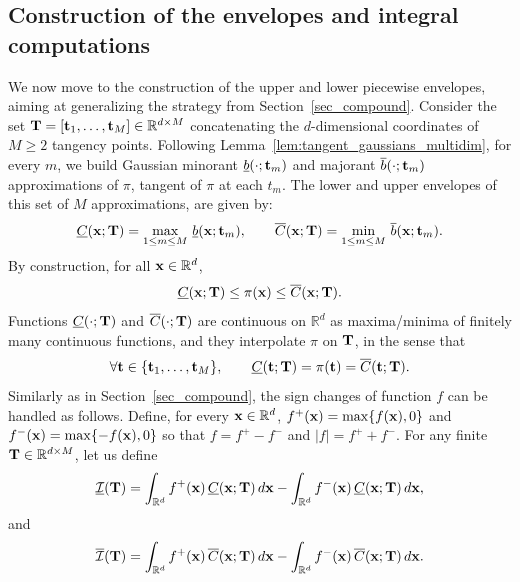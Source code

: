 \documentclass[review]{elsarticle}
\def\x{{\bf x}}
\def\t{{\bf t}}
\def\T{{\bf T}}
\begin{document}
{\subsection{Construction of the envelopes and integral computations}
%
We now move to the construction of the upper and lower piecewise envelopes, aiming at generalizing the strategy from Section~\ref{sec_compound}. Consider the set $\T=[\t_1,\dots,\t_M]\in \mathbb{R}^{d \times M}$ concatenating the $d$-dimensional coordinates of $M \geq 2$ tangency points. Following Lemma~\ref{lem:tangent_gaussians_multidim}, for every $m$, we build Gaussian minorant $\underline{b}(\cdot;\t_m)$ and majorant $\overline{b}(\cdot;\t_m)$ approximations of $\pi$, tangent of $\pi$ at each $t_m$. The lower and upper envelopes of this set of $M$ approximations, are given by:
\begin{equation}
\label{eq:envelopes_multidim}
\underline{C}(\x;\T) = \max_{1\le m\le M}\,\underline{b}(\x;\t_m),
\qquad
\overline{C}(\x;\T) = \min_{1\le m\le M}\,\overline{b}(\x;\t_m).
\end{equation}
By construction, for all $\x\in\mathbb{R}^d$,
\begin{equation}
\label{eq:envelope_bounds_multidim}
\underline{C}(\x;\T)\le \pi(\x)\le \overline{C}(\x;\T).
\end{equation}
Functions $\underline{C}(\cdot;\T)$ and $\overline{C}(\cdot;\T)$ are continuous on $\mathbb{R}^d$ as maxima/minima of finitely many continuous functions, and they interpolate $\pi$ on $\T$, in the sense that
\begin{equation}
\label{eq:interpolation_multidim}
\forall \t \in \{\t_1,\ldots,\t_M\},\qquad
\underline{C}(\t;\T)=\pi(\t)=\overline{C}(\t;\T).
\end{equation}
Similarly as in Section~\ref{sec_compound}, the sign changes of function $f$ can be handled as follows. Define, for every $\x \in \mathbb{R}^d$, $f^+(\x)=\max\{f(\x),0\}$ and $f^-(\x)=\max\{-f(\x),0\}$ so that $f=f^+-f^-$ and $|f|=f^++f^-$. For any finite $\T\in\mathbb{R}^{d \times M}$, let us define
\begin{equation}
\label{eq:Id_bounds_multidim}
\underline{\mathcal{I}}(\T) = \int_{\mathbb{R}^d} f^+(\x)\,\underline{C}(\x;\T)\,d\x
-\int_{\mathbb{R}^d} f^-(\x)\,\underline{C}(\x;\T)\,d\x,
\end{equation}
and
\begin{equation}
\label{eq:Id_bar_bounds_multidim}
\overline{\mathcal{I}}(\T) = \int_{\mathbb{R}^d} f^+(\x)\,\overline{C}(\x;\T)\,d\x
-\int_{\mathbb{R}^d} f^-(\x)\,\overline{C}(\x;\T)\,d\x.

\end{equation}}
\end{document}
